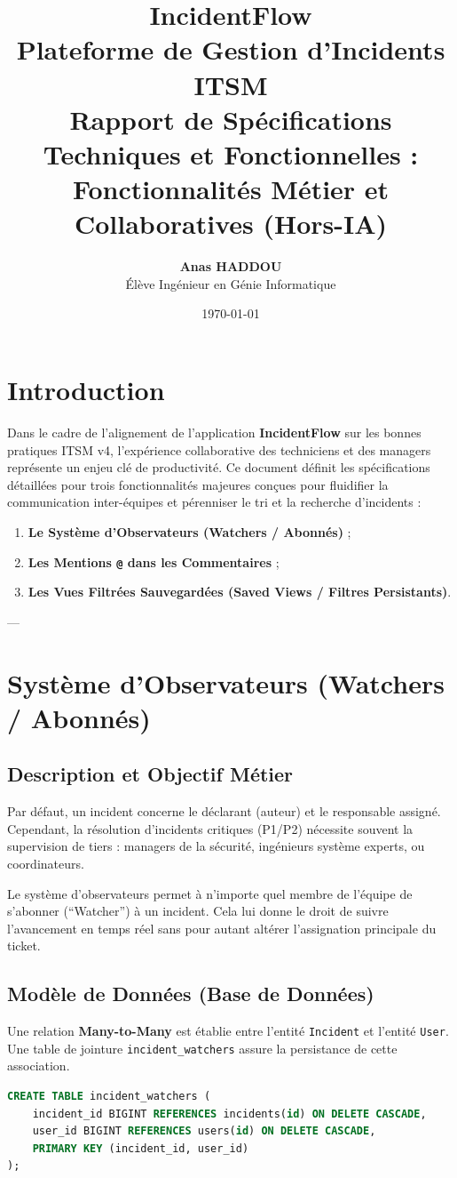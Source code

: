 \documentclass[12pt,a4paper]{article}
\title{
    \textbf{\Huge IncidentFlow}\\[0.5cm]
    \Large Plateforme de Gestion d'Incidents ITSM\\[1.5cm]
    \textbf{\Large Rapport de Spécifications Techniques et Fonctionnelles :\\ Fonctionnalités Métier et Collaboratives (Hors-IA)}
    \vspace{1cm}
}
\author{\textbf{Anas HADDOU} \\ Élève Ingénieur en Génie Informatique}
\date{\today}
\begin{document}
\maketitle
\thispagestyle{empty}
\clearpage

\tableofcontents
\clearpage

\section{Introduction}
Dans le cadre de l'alignement de l'application \textbf{IncidentFlow} sur les bonnes pratiques ITSM v4, l'expérience collaborative des techniciens et des managers représente un enjeu clé de productivité. Ce document définit les spécifications détaillées pour trois fonctionnalités majeures conçues pour fluidifier la communication inter-équipes et pérenniser le tri et la recherche d'incidents :
\begin{enumerate}
    \item \textbf{Le Système d'Observateurs (Watchers / Abonnés)} ;
    \item \textbf{Les Mentions \texttt{@} dans les Commentaires} ;
    \item \textbf{Les Vues Filtrées Sauvegardées (Saved Views / Filtres Persistants)}.
\end{enumerate}

---

\section{Système d'Observateurs (Watchers / Abonnés)}
\subsection{Description et Objectif Métier}
Par défaut, un incident concerne le déclarant (auteur) et le responsable assigné. Cependant, la résolution d'incidents critiques (P1/P2) nécessite souvent la supervision de tiers : managers de la sécurité, ingénieurs système experts, ou coordinateurs. 

Le système d'observateurs permet à n'importe quel membre de l'équipe de s'abonner (``Watcher'') à un incident. Cela lui donne le droit de suivre l'avancement en temps réel sans pour autant altérer l'assignation principale du ticket.

\subsection{Modèle de Données (Base de Données)}
Une relation \textbf{Many-to-Many} est établie entre l'entité \texttt{Incident} et l'entité \texttt{User}. Une table de jointure \texttt{incident\_watchers} assure la persistance de cette association.
\begin{lstlisting}[language=SQL, caption=Schema SQL de la table de jointure, label=sql-watchers]
CREATE TABLE incident_watchers (
    incident_id BIGINT REFERENCES incidents(id) ON DELETE CASCADE,
    user_id BIGINT REFERENCES users(id) ON DELETE CASCADE,
    PRIMARY KEY (incident_id, user_id)
);
\end{lstlisting}
\end{document}

